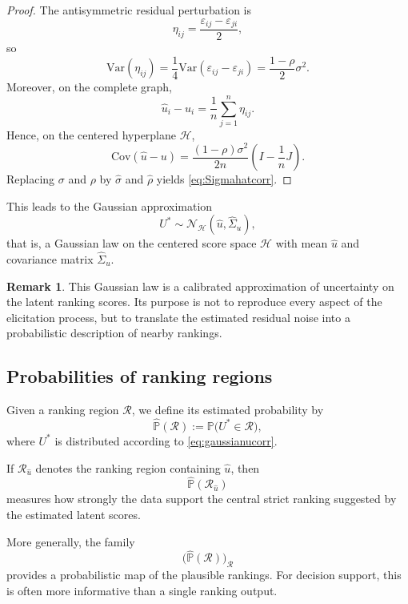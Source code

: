 \documentclass[11pt]{amsart}
\theoremstyle{definition}
\newtheorem{remark}[definition]{Remark}
\theoremstyle{plain}
\numberwithin{equation}{section}
\begin{document}
\begin{proof}
The antisymmetric residual perturbation is
\[
\eta_{ij}=\frac{\varepsilon_{ij}-\varepsilon_{ji}}{2},
\]
so
\[
\mathrm{Var}(\eta_{ij})
=
\frac14\mathrm{Var}(\varepsilon_{ij}-\varepsilon_{ji})
=
\frac{1-\rho}{2}\sigma^2.
\]
Moreover, on the complete graph,
\[
\widehat u_i-u_i=\frac1n\sum_{j=1}^n \eta_{ij}.
\]
Hence, on the centered hyperplane $\mathcal H$,
\[
\mathrm{Cov}(\widehat u-u)
=
\frac{(1-\rho)\sigma^2}{2n}
\left(I-\frac1nJ\right).
\]
Replacing $\sigma$ and $\rho$ by $\widehat\sigma$ and $\widehat\rho$ yields \eqref{eq:Sigmahatcorr}.
\end{proof}

This leads to the Gaussian approximation
\begin{equation}\label{eq:gaussianucorr}
U^\ast\sim \mathcal N_{\mathcal H}(\widehat u,\widehat\Sigma_u),
\end{equation}
that is, a Gaussian law on the centered score space $\mathcal H$ with mean $\widehat u$ and covariance matrix $\widehat\Sigma_u$.

\begin{remark}
This Gaussian law is a calibrated approximation of uncertainty on the latent ranking scores. Its purpose is not to reproduce every aspect of the elicitation process, but to translate the estimated residual noise into a probabilistic description of nearby rankings.
\end{remark}

\subsection{Probabilities of ranking regions}

Given a ranking region $\mathcal R$, we define its estimated probability by
\begin{equation}\label{eq:pregioncorr}
\widehat{\mathbb P}(\mathcal R)
:=
\mathbb P\bigl(U^\ast\in\mathcal R\bigr),
\end{equation}
where $U^\ast$ is distributed according to \eqref{eq:gaussianucorr}.

If $\mathcal R_{\widehat u}$ denotes the ranking region containing $\widehat u$, then
\[
\widehat{\mathbb P}(\mathcal R_{\widehat u})
\]
measures how strongly the data support the central strict ranking suggested by the estimated latent scores.

More generally, the family
\[
\bigl(\widehat{\mathbb P}(\mathcal R)\bigr)_{\mathcal R}
\]
provides a probabilistic map of the plausible rankings. For decision support, this is often more informative than a single ranking output.
\end{document}
